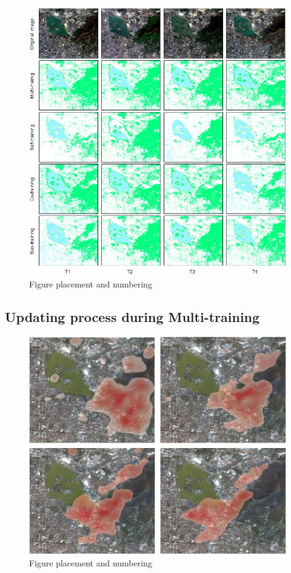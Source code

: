 \documentclass{isprs} %
\begin{document}
\begin{figure}[ht!]
	\begin{center}
			\includegraphics[width=2.0\columnwidth]{figures/images/resultMap2.png}
		\caption{Figure placement and numbering}
	\label{fig:studyArea}
	\end{center}
\end{figure}

\subsection{Updating process during Multi-training}

\begin{figure}[ht!]
	\begin{center}
			\includegraphics[width=2.0\columnwidth]{figures/images/update_loc.jpg}
		\caption{Figure placement and numbering}
	\label{fig:updateloc}
	\end{center}
\end{figure}
\end{document}
